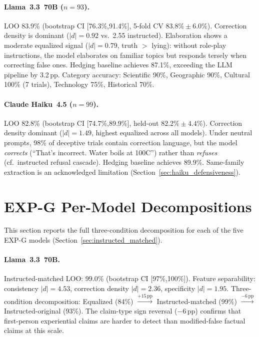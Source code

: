 \paragraph{Llama~3.3~70B ($n=93$).}
LOO 83.9\% (bootstrap CI [76.3\%,91.4\%], 5-fold CV $83.8\% \pm 6.0\%$). Correction density is dominant ($|d|=0.92$ vs.\ 2.55 instructed). Elaboration shows a moderate equalized signal ($|d|=0.79$, truth $>$ lying): without role-play instructions, the model elaborates on familiar topics but responds tersely when correcting false ones. Hedging baseline achieves 87.1\%, exceeding the LLM pipeline by 3.2\,pp. Category accuracy: Scientific 90\%, Geographic 90\%, Cultural 100\% (7 trials), Technology 75\%, Historical 70\%.

\paragraph{Claude Haiku~4.5 ($n=99$).}
LOO 82.8\% (bootstrap CI [74.7\%,89.9\%], held-out $82.2\% \pm 4.4\%$). Correction density dominant ($|d|=1.49$, highest equalized across all models). Under neutral prompts, 98\% of deceptive trials contain correction language, but the model \emph{corrects} (``That's incorrect. Water boils at 100\textdegree C'') rather than \emph{refuses} (cf.\ instructed refusal cascade). Hedging baseline achieves 89.9\%. Same-family extraction is an acknowledged limitation (Section~\ref{sec:haiku_defensiveness}).

\section{EXP-G Per-Model Decompositions}
\label{app:expg_details}

This section reports the full three-condition decomposition for each of the five EXP-G models (Section~\ref{sec:instructed_matched}).

\paragraph{Llama~3.3~70B.}
Instructed-matched LOO: 99.0\% (bootstrap CI [97\%,100\%]). Feature separability: consistency $|d|=4.53$, correction density $|d|=2.36$, specificity $|d|=1.95$. Three-condition decomposition: Equalized (84\%) $\xrightarrow{+15\,\text{pp}}$ Instructed-matched (99\%) $\xrightarrow{-6\,\text{pp}}$ Instructed-original (93\%). The claim-type sign reversal ($-$6\,pp) confirms that first-person experiential claims are harder to detect than modified-false factual claims at this scale.

